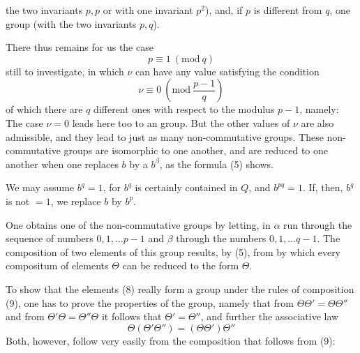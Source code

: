 the two invariants $p, p$ or with one invariant $p^2$), and,
if $p$ is different from $q$, one group (with the two invariants
$p, q$).

There thus remains for us the case
\[
p \equiv 1\ (\mathrm{mod}\ q)
\]
still to investigate, in which $\nu$ can have any value satisfying the condition
\[
\nu \equiv 0\ \left(\mathrm{mod}\ \frac{p-1}{q}\right)
\]
of which there are $q$ different ones with respect to the modulus
$p - 1$, namely:
The case $\nu = 0$ leads here too to an  group.
But the other values of $\nu$ are also admissible, and they lead
to just as many non-commutative groups. These non-commutative
groups are isomorphic to one another, and are reduced
to one another when one replaces $b$ by a $b^\beta$,
as the formula (5) shows.

We may assume $b^q = 1$, for $b^q$ is certainly contained in $Q$,
and $b^{pq} = 1$. If, then, $b^q$ is not $= 1$, we replace
$b$ by $b^p$.

One obtains one of the non-commutative groups by letting,
in
$\alpha$ run through the sequence of numbers $0, 1, \dots p - 1$ and $\beta$ through the numbers
$0, 1, \dots q - 1$. The composition of two
elements of this group results, by (5), from
by which every compositum of elements $\Theta$ can be reduced to the
form $\Theta$.

To show that the elements (8) really form a group under
the rules of composition (9), one has to prove the properties
of the group, namely that from $\Theta\Theta' = \Theta\Theta''$ and from $\Theta'\Theta = \Theta''\Theta$
it follows that $\Theta' = \Theta''$, and further the associative law
\[
\Theta(\Theta'\Theta'') = (\Theta\Theta')\Theta''
\]
Both, however, follow very easily from the composition
that follows from (9):
